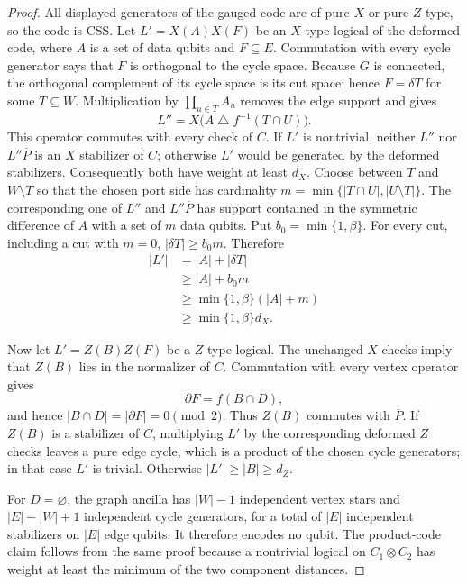 \documentclass[aps,prx,reprint,superscriptaddress,nofootinbib,floatfix,longbibliography]{revtex4-2}
\theoremstyle{definition}
\begin{document}
\begin{proof}
All displayed generators of the gauged code are of pure $X$ or pure $Z$
type, so the code is CSS.  Let
$L'=X(A)X(F)$ be an $X$-type logical of the deformed code, where $A$ is a
set of data qubits and $F\subseteq E$.  Commutation with every cycle
generator says that $F$ is orthogonal to the cycle space.  Because $G$ is
connected, the orthogonal complement of its cycle space is its cut space;
hence $F=\delta T$ for some $T\subseteq W$.  Multiplication by
$\prod_{u\in T}A_u$ removes the edge support and gives
\begin{equation}
 L''=X\bigl(A\mathbin\triangle f^{-1}(T\cap U)\bigr).
\end{equation}
This operator commutes with every check of $C$.  If $L'$ is nontrivial,
neither $L''$ nor $L''\overline P$ is an $X$ stabilizer of $C$; otherwise
$L'$ would be generated by the deformed stabilizers.  Consequently both
have weight at least $d_X$.  Choose between $T$ and $W\setminus T$ so that
the chosen port side has cardinality
$m=\min\{|T\cap U|,|U\setminus T|\}$.  The corresponding one of $L''$ and
$L''\overline P$ has support contained in the symmetric difference of
$A$ with a set of $m$ data qubits.  Put $b_0=\min\{1,\beta\}$. For every cut, including a cut with $m=0$, $|\delta T|\geq b_0m$. Therefore
\begin{align}
 |L'|&=|A|+|\delta T| \\
 &\geq |A|+b_0m \\
 &\geq \min\{1,\beta\}(|A|+m) \\
 &\geq \min\{1,\beta\}d_X.
\end{align}

Now let $L'=Z(B)Z(F)$ be a $Z$-type logical.  The unchanged $X$ checks imply
that $Z(B)$ lies in the normalizer of $C$.  Commutation with every vertex
operator gives
\begin{equation}
 \partial F=f(B\cap D),
\end{equation}
and hence $|B\cap D|=|\partial F|=0\pmod 2$.  Thus $Z(B)$ commutes with
$\overline P$.  If $Z(B)$ is a stabilizer of $C$, multiplying $L'$ by the
corresponding deformed $Z$ checks leaves a pure edge cycle, which is a
product of the chosen cycle generators; in that case $L'$ is trivial.
Otherwise $|L'|\geq |B|\geq d_Z$.

For $D=\varnothing$, the graph ancilla has $|W|-1$ independent vertex
stars and $|E|-|W|+1$ independent cycle generators, for a total of $|E|$
independent stabilizers on $|E|$ edge qubits.  It therefore encodes no
qubit.  The product-code claim follows from the same proof because a
nontrivial logical on $C_1\otimes C_2$ has weight at least the minimum of
the two component distances.
\end{proof}
\end{document}
